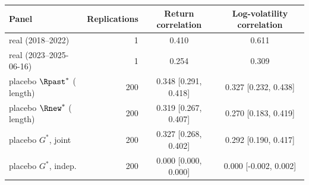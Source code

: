 \begin{tabular}{lrcc}
\toprule
Panel & Replications & Return correlation & Log-volatility correlation \\
\midrule
real \TRAIN{} (2018--2022) & 1 & 0.410 & 0.611 \\
real \TEST{} (2023--2025-06-16) & 1 & 0.254 & 0.309 \\
placebo $\Rpast^*$ (\TRAIN{} length) & 200 & 0.348 [0.291, 0.418] & 0.327 [0.232, 0.438] \\
placebo $\Rnew^*$ (\TEST{} length) & 200 & 0.319 [0.267, 0.407] & 0.270 [0.183, 0.419] \\
placebo $G^*$, joint & 200 & 0.327 [0.268, 0.402] & 0.292 [0.190, 0.417] \\
placebo $G^*$, indep. & 200 & 0.000 [0.000, 0.000] & 0.000 [-0.002, 0.002] \\
\bottomrule
\end{tabular}
